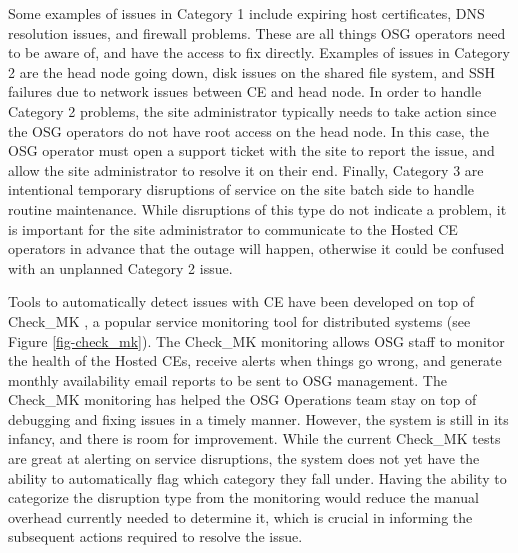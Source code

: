 \documentclass{webofc}
\begin{document}
Some examples of issues in Category 1 include expiring host certificates, DNS resolution issues, and firewall problems. These are all things OSG operators need to be aware of, and have the access to fix directly. Examples of issues in Category 2 are the head node going down, disk issues on the shared file system, and SSH failures due to network issues between CE and head node. In order to handle Category 2 problems, the site administrator typically needs to take action since the OSG operators do not have root access on the head node. In this case, the OSG operator must open a support ticket with the site to report the issue, and allow the site administrator to resolve it on their end. Finally, Category 3 are intentional temporary disruptions of service on the site batch side to handle routine maintenance. While disruptions of this type do not indicate a problem, it is important for the site administrator to communicate to the Hosted CE operators in advance that the outage will happen, otherwise it could be confused with an unplanned Category 2 issue.

Tools to automatically detect issues with CE have been developed on top of Check\_MK \cite{CheckMK}, a popular service monitoring tool for distributed systems (see Figure \ref{fig-check_mk}). The Check\_MK monitoring allows OSG staff to monitor the health of the Hosted CEs, receive alerts when things go wrong, and generate monthly availability email reports to be sent to OSG management. The Check\_MK monitoring has helped the OSG Operations team stay on top of debugging and fixing issues in a timely manner. However, the system is still in its infancy, and there is room for improvement. While the current Check\_MK tests are great at alerting on service disruptions, the system does not yet have the ability to automatically flag which category they fall under. Having the ability to categorize the disruption type from the monitoring would reduce the manual overhead currently needed to determine it, which is crucial in informing the subsequent actions required to resolve the issue.


\end{document}
